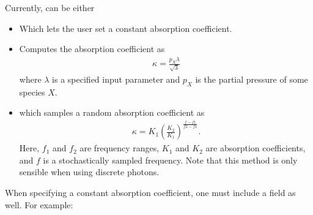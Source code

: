\documentclass[letterpaper,10pt,english]{sphinxmanual}
\begin{document}
\sphinxAtStartPar
Currently,  can be either
\begin{itemize}
\item {} 
\sphinxAtStartPar
{} Which lets the user set a constant absorption coefficient.

\item {} 
\sphinxAtStartPar
{} Computes the absorption coefficient as
\begin{equation*}
\begin{split}\kappa = \frac{p_X\lambda}{\sqrt{3}}\end{split}
\end{equation*}
\sphinxAtStartPar
where \(\lambda\) is a specified input parameter and \(p_X\) is the partial pressure of some species \(X\).

\item {} 
\sphinxAtStartPar
{} which samples a random absorption coefficient as
\begin{equation*}
\begin{split}\kappa = K_1 \left(\frac{K_2}{K_1}\right)^{\frac{f-f1}{f2-f1}}.\end{split}
\end{equation*}
\sphinxAtStartPar
Here, \(f_1\) and \(f_2\) are frequency ranges, \(K_1\) and \(K_2\) are absorption coefficients, and \(f\) is a stochastically sampled frequency.
Note that this method is only sensible when using discrete photons.

\end{itemize}

\sphinxAtStartPar
{}

\sphinxAtStartPar
When specifying a constant absorption coefficient, one must include a field  as well.
For example:

\begin{sphinxVerbatim}[commandchars=\\\{\},formatcom=\scriptsize]
   \PYG{p}{[}
        
        
        
   \PYG{p}{]}
\end{sphinxVerbatim}
\end{document}
